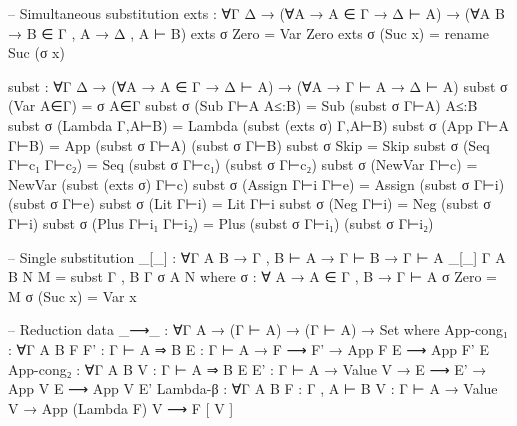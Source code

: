 \documentclass{article}
\begin{document}
\begin{prev}
\begin{code}
-- Simultaneous substitution
exts : ∀{Γ Δ} → (∀{A} → A ∈ Γ → Δ ⊢ A) 
              → (∀{A B} → B ∈ Γ , A → Δ , A ⊢ B)
exts σ Zero = Var Zero
exts σ (Suc x) = rename Suc (σ x)

subst : ∀{Γ Δ} → (∀{A} → A ∈ Γ → Δ ⊢ A)
               → (∀{A} → Γ ⊢ A → Δ ⊢ A)
subst σ (Var A∈Γ) = σ A∈Γ
subst σ (Sub Γ⊢A A≤:B) = Sub (subst σ Γ⊢A) A≤:B
subst σ (Lambda Γ,A⊢B) = Lambda (subst (exts σ) Γ,A⊢B)
subst σ (App Γ⊢A Γ⊢B) = App (subst σ Γ⊢A) (subst σ Γ⊢B)
subst σ Skip = Skip
subst σ (Seq Γ⊢c₁ Γ⊢c₂) = Seq (subst σ Γ⊢c₁) (subst σ Γ⊢c₂)
subst σ (NewVar Γ⊢c) = NewVar (subst (exts σ) Γ⊢c)
subst σ (Assign Γ⊢i Γ⊢e) = Assign (subst σ Γ⊢i) (subst σ Γ⊢e)
subst σ (Lit Γ⊢i) = Lit Γ⊢i
subst σ (Neg Γ⊢i) = Neg (subst σ Γ⊢i)
subst σ (Plus Γ⊢i₁ Γ⊢i₂) = Plus (subst σ Γ⊢i₁) (subst σ Γ⊢i₂)

-- Single substitution
_[_] : ∀{Γ A B} → Γ , B ⊢ A → Γ ⊢ B → Γ ⊢ A
_[_] {Γ} {A} {B} N M = subst {Γ , B} {Γ} σ {A} N
    where
    σ : ∀ {A} → A ∈ Γ , B → Γ ⊢ A
    σ Zero = M
    σ (Suc x) = Var x

-- Reduction
data _⟶_ : ∀{Γ A} → (Γ ⊢ A) → (Γ ⊢ A) → Set where
    App-cong₁ : ∀{Γ A B} {F F' : Γ ⊢ A ⇒ B} {E : Γ ⊢ A} 
                    → F ⟶ F' → App F E ⟶ App F' E
    App-cong₂ : ∀{Γ A B} {V : Γ ⊢ A ⇒ B} {E E' : Γ ⊢ A} 
                    → Value V → E ⟶ E' → App V E ⟶ App V E'
    Lambda-β : ∀{Γ A B} {F : Γ , A ⊢ B} {V : Γ ⊢ A}
                    → Value V → App (Lambda F) V ⟶ F [ V ]
\end{code}
\end{prev}
\end{document}

